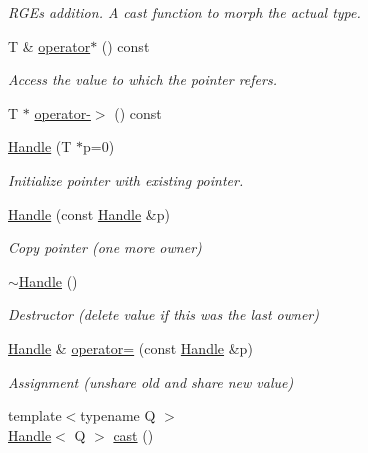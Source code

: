 \begin{DoxyCompactItemize}
\begin{DoxyCompactList}\small\item\em R\+GE\textquotesingle{}s addition. A cast function to morph the actual type. \end{DoxyCompactList}\item 
T \& \mbox{\hyperlink{classADAT_1_1Handle_a86f851b3a2e8a6084e50bfad306260f4}{operator$\ast$}} () const
\begin{DoxyCompactList}\small\item\em Access the value to which the pointer refers. \end{DoxyCompactList}\item 
T $\ast$ \mbox{\hyperlink{classADAT_1_1Handle_ad58ef1e032066f7d6b01c2a76cfac5e4}{operator-\/$>$}} () const
\item 
\mbox{\hyperlink{classADAT_1_1Handle_a510e41b73c3f685f4eb78a91020782c0}{Handle}} (T $\ast$p=0)
\begin{DoxyCompactList}\small\item\em Initialize pointer with existing pointer. \end{DoxyCompactList}\item 
\mbox{\hyperlink{classADAT_1_1Handle_af9529874ca6ca9db10dbbeeb0a776d84}{Handle}} (const \mbox{\hyperlink{classADAT_1_1Handle}{Handle}} \&p)
\begin{DoxyCompactList}\small\item\em Copy pointer (one more owner) \end{DoxyCompactList}\item 
\mbox{\hyperlink{classADAT_1_1Handle_a358ca2d3df9674e7ccb416574df96ce5}{$\sim$\+Handle}} ()
\begin{DoxyCompactList}\small\item\em Destructor (delete value if this was the last owner) \end{DoxyCompactList}\item 
\mbox{\hyperlink{classADAT_1_1Handle}{Handle}} \& \mbox{\hyperlink{classADAT_1_1Handle_a2d5773885c448de401319f9523742954}{operator=}} (const \mbox{\hyperlink{classADAT_1_1Handle}{Handle}} \&p)
\begin{DoxyCompactList}\small\item\em Assignment (unshare old and share new value) \end{DoxyCompactList}\item 
{\footnotesize template$<$typename Q $>$ }\\\mbox{\hyperlink{classADAT_1_1Handle}{Handle}}$<$ Q $>$ \mbox{\hyperlink{classADAT_1_1Handle_aac9634a0530419244ef076e63ff2b984}{cast}} ()

\end{DoxyCompactItemize}
